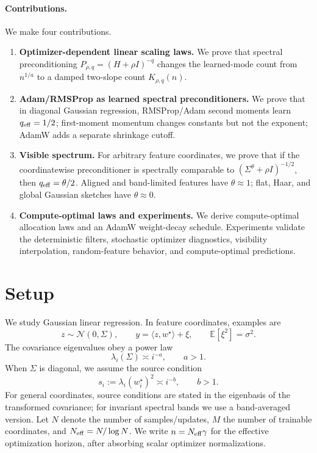 \documentclass[11pt]{article}
\newcommand{\E}{\mathbb{E}}
\begin{document}
\paragraph{Contributions.}
We make four contributions.
\begin{enumerate}[leftmargin=*]
    \item \textbf{Optimizer-dependent linear scaling laws.}  We prove that spectral preconditioning $P_{\rho,q}=(H+\rho I)^{-q}$ changes the learned-mode count from $n^{1/a}$ to a damped two-slope count $K_{\rho,q}(n)$.
    \item \textbf{Adam/RMSProp as learned spectral preconditioners.}  We prove that in diagonal Gaussian regression, RMSProp/Adam second moments learn $q_{\rm eff}=1/2$; first-moment momentum changes constants but not the exponent; AdamW adds a separate shrinkage cutoff.
    \item \textbf{Visible spectrum.}  For arbitrary feature coordinates, we prove that if the coordinatewise preconditioner is spectrally comparable to $(\Sigma^\theta+\rho I)^{-1/2}$, then $q_{\rm eff}=\theta/2$.  Aligned and band-limited features have $\theta\approx1$; flat, Haar, and global Gaussian sketches have $\theta\approx0$.
    \item \textbf{Compute-optimal laws and experiments.}  We derive compute-optimal allocation laws and an AdamW weight-decay schedule.  Experiments validate the deterministic filters, stochastic optimizer diagnostics, visibility interpolation, random-feature behavior, and compute-optimal predictions.
\end{enumerate}

\section{Setup}

We study Gaussian linear regression.  In feature coordinates, examples are
\begin{equation}
    z\sim\mathcal N(0,\Sigma),\qquad
    y=\langle z,w^\star\rangle+\xi,\qquad
    \E[\xi^2]=\sigma^2.
\end{equation}
The covariance eigenvalues obey a power law
\begin{equation}
\label{eq:power-law-spectrum}
    \lambda_i(\Sigma)\asymp i^{-a},\qquad a>1.
\end{equation}
When $\Sigma$ is diagonal, we assume the source condition
\begin{equation}
\label{eq:source}
    s_i:=\lambda_i(w_i^\star)^2\asymp i^{-b},\qquad b>1.
\end{equation}
For general coordinates, source conditions are stated in the eigenbasis of the transformed covariance; for invariant spectral bands we use a band-averaged version.  Let $N$ denote the number of samples/updates, $M$ the number of trainable coordinates, and $N_{\rm eff}=N/\log N$.  We write $n=N_{\rm eff}\gamma$ for the effective optimization horizon, after absorbing scalar optimizer normalizations.
\end{document}
